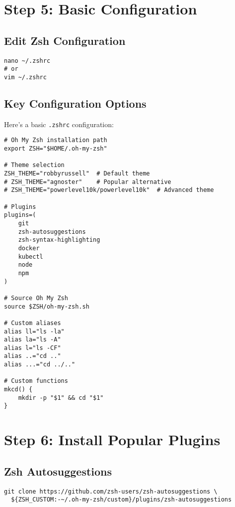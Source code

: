 \documentclass{article}
\begin{document}
\section{Step 5: Basic Configuration}

\subsection{Edit Zsh Configuration}

\begin{verbatim}
nano ~/.zshrc
# or
vim ~/.zshrc
\end{verbatim}

\subsection{Key Configuration Options}

Here's a basic \verb|.zshrc| configuration:

\begin{verbatim}
# Oh My Zsh installation path
export ZSH="$HOME/.oh-my-zsh"

# Theme selection
ZSH_THEME="robbyrussell"  # Default theme
# ZSH_THEME="agnoster"    # Popular alternative
# ZSH_THEME="powerlevel10k/powerlevel10k"  # Advanced theme

# Plugins
plugins=(
    git
    zsh-autosuggestions
    zsh-syntax-highlighting
    docker
    kubectl
    node
    npm
)

# Source Oh My Zsh
source $ZSH/oh-my-zsh.sh

# Custom aliases
alias ll="ls -la"
alias la="ls -A"
alias l="ls -CF"
alias ..="cd .."
alias ...="cd ../.."

# Custom functions
mkcd() {
    mkdir -p "$1" && cd "$1"
}
\end{verbatim}

\section{Step 6: Install Popular Plugins}

\subsection{Zsh Autosuggestions}

\begin{verbatim}
git clone https://github.com/zsh-users/zsh-autosuggestions \
  ${ZSH_CUSTOM:-~/.oh-my-zsh/custom}/plugins/zsh-autosuggestions
\end{verbatim}
\end{document}
